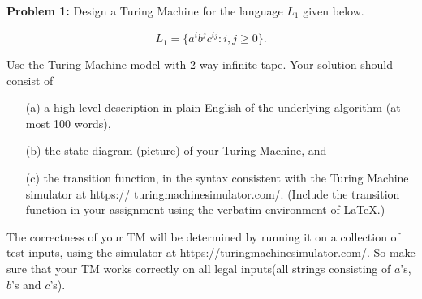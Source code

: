 
\noindent \textbf{Problem 1:} Design a Turing Machine for the language $L_1$ given below.

$$L_1 = \{a^i b^j c^{ij} : i, j \geq 0\}.$$

\noindent Use the Turing Machine model with 2-way infinite tape. Your solution should consist of

\begin{itemize}
    \item[(a)] a high-level description in plain English of the underlying algorithm (at most 100 words),
    \item[(b)] the state diagram (picture) of your Turing Machine, and
    \item[(c)] the transition function, in the syntax consistent with the Turing Machine simulator at https://
    turingmachinesimulator.com/. (Include the transition function in your assignment using the verbatim environment of LaTeX.)
\end{itemize}

\noindent The correctness of your TM will be determined by running it on a collection of test inputs, using the simulator at https://turingmachinesimulator.com/. So make sure that your TM works correctly on all legal inputs(all strings consisting of $a$'s, $b$'s and $c$'s).

